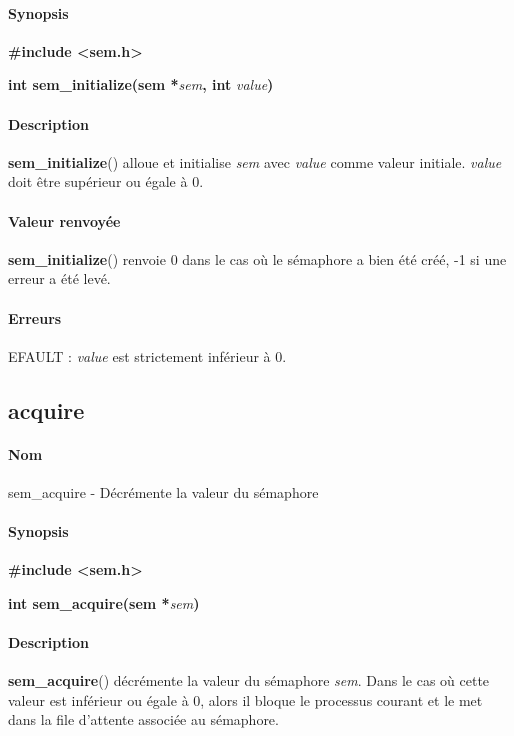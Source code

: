 \documentclass[12pt]{article}
\begin{document}
        \paragraph{Synopsis\\}
        \textbf{\#include <sem.h>}

        \textbf{int sem\_initialize(sem *}\textit{sem}\textbf{, int }\textit{value}\textbf{)}
        \paragraph{Description\\}
        \textbf{sem\_initialize}() alloue et initialise \textit{sem} avec \textit{value} comme valeur initiale. \textit{value} doit être supérieur ou égale à 0.

        \paragraph{Valeur renvoyée\\}
        \textbf{sem\_initialize}() renvoie 0 dans le cas où le sémaphore a bien été créé, -1 si une erreur a été levé.
        \paragraph{Erreurs\\}
        EFAULT : \textit{value} est strictement inférieur à 0.
    \newpage
    \subsection{acquire}
        \paragraph{Nom\\}
        sem\_acquire - Décrémente la valeur du sémaphore
        \paragraph{Synopsis\\}
        \textbf{\#include <sem.h>}

        \textbf{int sem\_acquire(sem *}\textit{sem}\textbf{)}
        \paragraph{Description\\}
        \textbf{sem\_acquire}() décrémente la valeur du sémaphore \textit{sem}. Dans le cas où cette valeur est inférieur ou égale à 0, alors il bloque le processus courant et le met dans la file d'attente associée au sémaphore.
\end{document}
